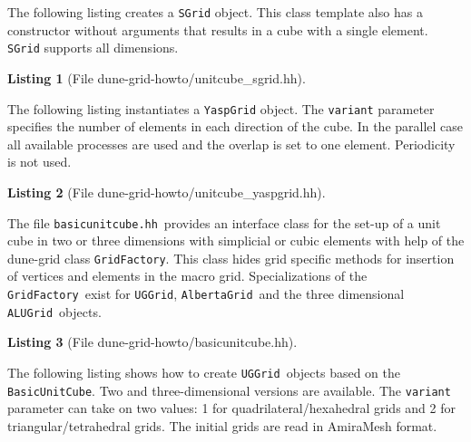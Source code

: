 \documentclass[11pt,a4paper,headinclude,footinclude,DIV16,normalheadings]{scrreprt}
\newtheorem{lst}{Listing}
\begin{document}

The following listing creates a \lstinline!SGrid! object. This class
template also has a constructor without arguments that results in a
cube with a single element. \lstinline!SGrid! supports all dimensions.

\begin{lst}[File dune-grid-howto/unitcube\_sgrid.hh] \mbox{}
\nopagebreak

\end{lst}


The following listing instantiates a \lstinline!YaspGrid! object. The
\lstinline!variant! parameter specifies the number of elements in each
direction of the cube. In the parallel case all available processes
are used and the overlap is set to one element. Periodicity is not
used.  

\begin{lst}[File dune-grid-howto/unitcube\_yaspgrid.hh] \mbox{}
\nopagebreak

\end{lst}


The file \lstinline!basicunitcube.hh!\ provides an interface class for the
set-up of a unit cube in two or three dimensions with simplicial or cubic
elements with help of the dune-grid class \lstinline!GridFactory!. This class
hides grid specific methods for insertion of vertices and elements in the macro
grid. Specializations of the \lstinline!GridFactory!\ exist for
\lstinline!UGGrid!, \lstinline!AlbertaGrid!\ and the three dimensional
\lstinline!ALUGrid!\ objects. 

\begin{lst}[File dune-grid-howto/basicunitcube.hh] \mbox{}
\nopagebreak

\end{lst}


The following listing shows how to create \lstinline!UGGrid!\
objects based on the \lstinline!BasicUnitCube!. Two and three-dimensional
versions are available. The \lstinline!variant! parameter can take on two
values: 1 for
quadrilateral/hexahedral grids and 2 for triangular/tetrahedral
grids. The initial grids are read in AmiraMesh format.
\end{document}
